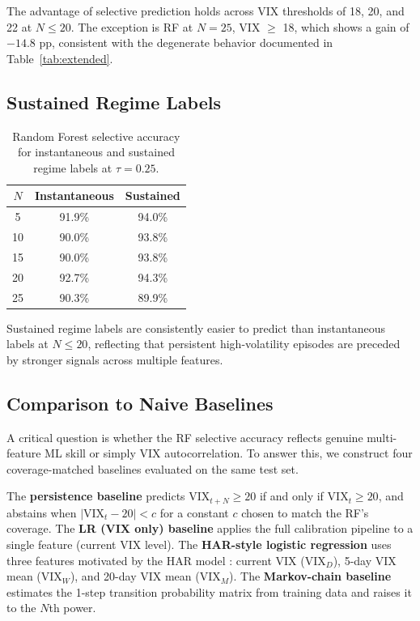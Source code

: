 \documentclass[12pt]{article}
\begin{document}
The advantage of selective prediction holds across VIX thresholds of 18, 20, and 22 at
$N \leq 20$. The exception is RF at $N = 25$, VIX $\geq$ 18, which shows a gain of $-14.8$ pp,
consistent with the degenerate behavior documented in Table~\ref{tab:extended}.

\subsection{Sustained Regime Labels}
\label{sec:sustained}

\begin{table}[H]
\centering
\caption{Random Forest selective accuracy for instantaneous and sustained regime labels at
$\tau = 0.25$.}
\label{tab:sustained}
\begin{tabular}{ccc}
\toprule
$N$ & Instantaneous & Sustained \\
\midrule
5  & 91.9\% & 94.0\% \\
10 & 90.0\% & 93.8\% \\
15 & 90.0\% & 93.8\% \\
20 & 92.7\% & 94.3\% \\
25 & 90.3\% & 89.9\% \\
\bottomrule
\end{tabular}
\end{table}

Sustained regime labels are consistently easier to predict than instantaneous labels at
$N \leq 20$, reflecting that persistent high-volatility episodes are preceded by stronger
signals across multiple features.

\subsection{Comparison to Naive Baselines}
\label{sec:baselines}

A critical question is whether the RF selective accuracy reflects genuine multi-feature ML skill
or simply VIX autocorrelation. To answer this, we construct four coverage-matched baselines
evaluated on the same test set.

The \textbf{persistence baseline} predicts $\text{VIX}_{t+N} \geq 20$ if and only if
$\text{VIX}_t \geq 20$, and abstains when $|\text{VIX}_t - 20| < c$ for a constant $c$ chosen
to match the RF's coverage. The \textbf{LR (VIX only) baseline} applies the full calibration
pipeline to a single feature (current VIX level). The \textbf{HAR-style logistic regression}
uses three features motivated by the HAR model \citep{corsi2009}: current VIX ($\text{VIX}_D$),
5-day VIX mean ($\text{VIX}_W$), and 20-day VIX mean ($\text{VIX}_M$). The
\textbf{Markov-chain baseline} estimates the 1-step transition probability matrix from training
data and raises it to the $N$th power.
\end{document}
